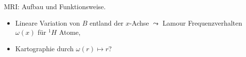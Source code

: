 \documentclass{subfiles}
\begin{document}
    \begin{Frage}
        MRI: Aufbau und Funktionsweise.
        \begin{itemize}[label=$\to$]
            \item Lineare Variation von $B$ entland der $x$-Achse $\leadsto$ Lamour Frequenzverhalten $\omega(x)$ für $^1H$ Atome,
            \item Kartographie durch $\omega(r)\mapsto r$?
        \end{itemize}
    \end{Frage}
    \begin{Antwort}
        
    \end{Antwort}
\end{document}
